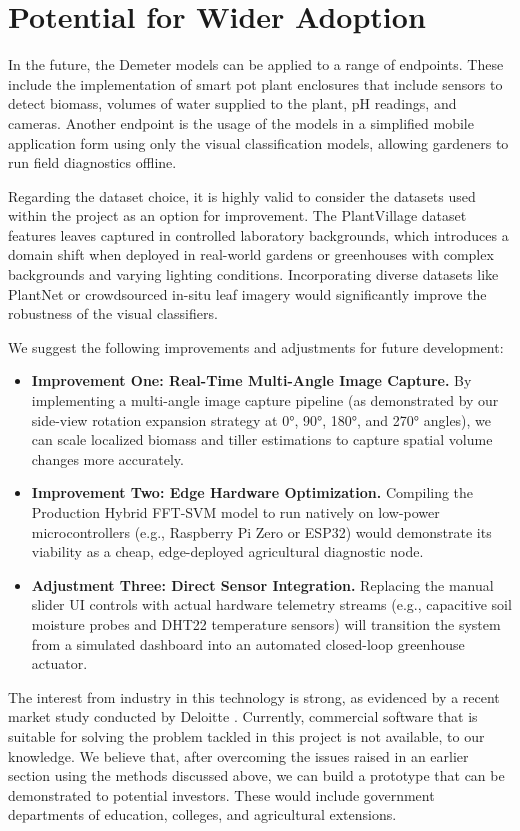 \documentclass[11pt,a4paper]{article}
\begin{document}
\section{Potential for Wider Adoption}
In the future, the Demeter models can be applied to a range of endpoints. These include the implementation of smart pot plant enclosures that include sensors to detect biomass, volumes of water supplied to the plant, pH readings, and cameras. Another endpoint is the usage of the models in a simplified mobile application form using only the visual classification models, allowing gardeners to run field diagnostics offline.

Regarding the dataset choice, it is highly valid to consider the datasets used within the project as an option for improvement. The PlantVillage dataset features leaves captured in controlled laboratory backgrounds, which introduces a domain shift when deployed in real-world gardens or greenhouses with complex backgrounds and varying lighting conditions. Incorporating diverse datasets like PlantNet or crowdsourced in-situ leaf imagery would significantly improve the robustness of the visual classifiers.

We suggest the following improvements and adjustments for future development:
\begin{itemize}
    \item \textbf{Improvement One: Real-Time Multi-Angle Image Capture.} By implementing a multi-angle image capture pipeline (as demonstrated by our side-view rotation expansion strategy at 0°, 90°, 180°, and 270° angles), we can scale localized biomass and tiller estimations to capture spatial volume changes more accurately.
    \item \textbf{Improvement Two: Edge Hardware Optimization.} Compiling the Production Hybrid FFT-SVM model to run natively on low-power microcontrollers (e.g., Raspberry Pi Zero or ESP32) would demonstrate its viability as a cheap, edge-deployed agricultural diagnostic node.
    \item \textbf{Adjustment Three: Direct Sensor Integration.} Replacing the manual slider UI controls with actual hardware telemetry streams (e.g., capacitive soil moisture probes and DHT22 temperature sensors) will transition the system from a simulated dashboard into an automated closed-loop greenhouse actuator.
\end{itemize}

The interest from industry in this technology is strong, as evidenced by a recent market study conducted by Deloitte \cite{deloitte2024}. Currently, commercial software that is suitable for solving the problem tackled in this project is not available, to our knowledge. We believe that, after overcoming the issues raised in an earlier section using the methods discussed above, we can build a prototype that can be demonstrated to potential investors. These would include government departments of education, colleges, and agricultural extensions.
	
\end{document}
